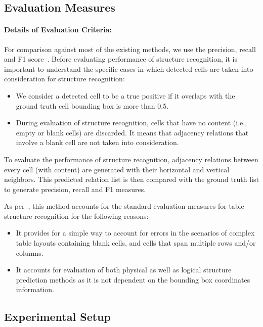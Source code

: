 \documentclass[runningheads]{llncs}
\begin{document}
\subsection*{Evaluation Measures}

\paragraph{\textbf{Details of Evaluation Criteria:}} For comparison against most of the existing methods, we use the precision, recall and F1 score~\cite{chi2019complicated,gobel2013icdar,shahab2010open}. Before evaluating performance of structure recognition, it is important to understand the specific cases in which detected cells are taken into consideration for structure recognition:
\begin{itemize}
    \item We consider a detected cell to be a true positive if it overlaps with the ground truth cell bounding box is more than 0.5.
\item During evaluation of structure recognition, cells that have no content (i.e., empty or blank cells) are discarded. It means that adjacency relations that involve a blank cell are not taken into consideration.
\end{itemize}

To evaluate the performance of structure recognition, adjacency relations between every cell (with content) are generated with their horizontal and vertical neighbors. This predicted relation list is then compared with the ground truth list to generate precision, recall and F1 measures.

As per~\cite{gobel2013icdar}, this method accounts for the standard evaluation measures for table structure recognition for the following reasons:
\begin{itemize}
    \item It provides for a simple way to account for errors in the scenarios of complex table layouts containing blank cells, and cells that span multiple rows and/or columns.
    \item It accounts for evaluation of both physical as well as logical structure prediction methods as it is not dependent on the bounding box coordinates information.
\end{itemize}


\subsection*{Experimental Setup} \label{experimental_setup_extra}
\end{document}
